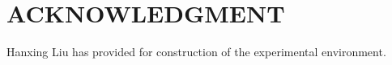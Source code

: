 \documentclass[letterpaper, 10 pt, conference]{ieeeconf}  %
\begin{document}
            
\section*{ACKNOWLEDGMENT}
Hanxing Liu has provided for construction of the experimental environment.
\end{document}
